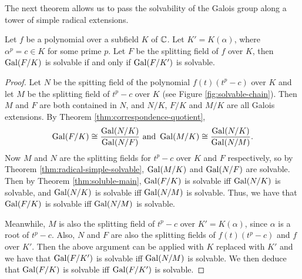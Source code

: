 The next theorem allows us to pass the solvability of the Galois group along a tower of simple radical extensions. 

%		

\begin{theorem} \label{thm:solvable:chain}
	Let $f$ be a polynomial over a subfield $K$ of $\mathbb C$. Let $K' = K(\alpha)$, where $\alpha^p = c \in K$ for some prime $p$. Let $F$ be the splitting field of $f$ over $K$, then $\operatorname{Gal}(F/K)$ is solvable if and only if $\operatorname{Gal}(F / K')$ is solvable. 
\end{theorem}



\begin{proof}
	Let $N$ be the spitting field of the polynomial $f(t)(t^p - c)$ over $K$ and let $M$ be the splitting field of $t^p -c $ over $K$ (see Figure \ref{fig:solvable-chain}). Then $M$ and $F$ are both contained in $N$, and $N/K$, $F/K$ and $M/K$ are all Galois extensions. By Theorem \ref{thm:correspondence-quotient}, 
	$$ \operatorname{Gal}(F / K) \cong \frac{\operatorname{Gal}(N / K)}{\operatorname{Gal}(N / F)} \text{ and } \operatorname{Gal}(M / K) \cong \frac{\operatorname{Gal}(N / K)}{\operatorname{Gal}(N / M)}.$$
	Now $M$ and $N$ are the splitting fields for $t^p - c$ over $K$ and $F$ respectively, so by Theorem \ref{thm:radical-simple-solvable}, $\operatorname{Gal}(M/K)$ and $\operatorname{Gal}(N / F)$ are solvable. Then by Theorem \ref{thm:soluble-main}, $\operatorname{Gal}(F/K)$ is solvable iff $\operatorname{Gal}(N/K)$ is solvable, and $\operatorname{Gal}(N / K)$ is solvable iff $\operatorname{Gal}(N/M)$ is solvable. Thus, we have that $\operatorname{Gal}(F/K)$ is solvable iff $\operatorname{Gal}(N/M)$ is solvable. 
	
	Meanwhile, $M$ is also the splitting field of $t^p - c$ over $K' = K(\alpha)$, since $\alpha$ is a root of $t^p - c$. Also, $N$ and $F$ are also the splitting fields of $f(t) (t^p - c)$ and $f$ over $K'$. Then the above argument can be applied with $K$ replaced with $K'$ and we have that $\operatorname{Gal}(F/K')$ is solvable iff $\operatorname{Gal}(N/M)$ is solvable. We then deduce that $\operatorname{Gal}(F/K)$ is solvable iff $\operatorname{Gal}(F/K')$ is solvable. 
\end{proof}

